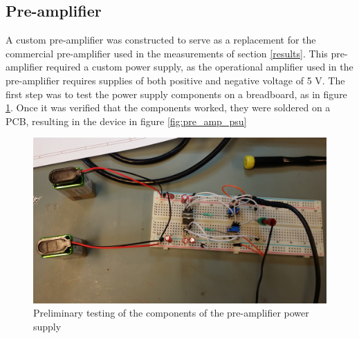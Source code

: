 \documentclass[a4paper]{article}
\begin{document}
\clearpage
\begin{appendices}

\section{Pre-amplifier}
\label{pre_amp}
A custom pre-amplifier was constructed to serve as a replacement for the commercial pre-amplifier used in the measurements of section \ref{results}.
This pre-amplifier required a custom power supply, as the operational amplifier used in the pre-amplifier requires supplies of both positive and negative voltage of 5 V.
The first step was to test the power supply components on a breadboard, as in figure \ref{fig:pre_amp_psu_testing}.
Once it was verified that the components worked, they were soldered on a PCB, resulting in the device in figure \ref{fig:pre_amp_psu}

\begin{figure}[ht!]
\centering
\includegraphics[width=\textwidth]{fig/IMG_20201005_104331-cropped.jpg}
\caption{Preliminary testing of the components of the pre-amplifier power supply}
\label{fig:pre_amp_psu_testing}
\end{figure}


\end{appendices}
\end{document}
